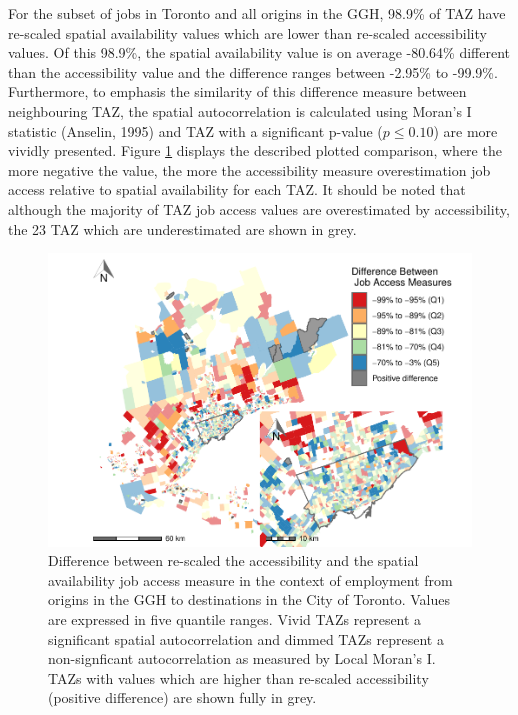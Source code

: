 \documentclass[]{elsarticle} %
\begin{document}
For the subset of jobs in Toronto and all origins in the GGH, 98.9\% of
TAZ have re-scaled spatial availability values which are lower than
re-scaled accessibility values. Of this 98.9\%, the spatial availability
value is on average -80.64\% different than the accessibility value and
the difference ranges between -2.95\% to -99.9\%. Furthermore, to
emphasis the similarity of this difference measure between neighbouring
TAZ, the spatial autocorrelation is calculated using Moran's I statistic
(Anselin, 1995) and TAZ with a significant p-value (\(p\le 0.10\)) are
more vividly presented. Figure \ref{fig:plot-local-i-Toronto} displays
the described plotted comparison, where the more negative the value, the
more the accessibility measure overestimation job access relative to
spatial availability for each TAZ. It should be noted that although the
majority of TAZ job access values are overestimated by accessibility,
the 23 TAZ which are underestimated are shown in grey.

\begin{figure}
\includegraphics[width=1\linewidth]{Spatial-Availability_files/figure-latex/plot-local-i-Toronto-1} \caption{\label{fig:plot-local-i-Toronto}Difference between re-scaled the accessibility and the spatial availability job access measure in the context of employment from origins in the GGH to destinations in the City of Toronto. Values are expressed in five quantile ranges. Vivid TAZs represent a significant spatial autocorrelation and dimmed TAZs represent a non-signficant autocorrelation as measured by Local Moran's I. TAZs with values which are higher than re-scaled accessibility (positive difference) are shown fully in grey.}\label{fig:plot-local-i-Toronto}
\end{figure}
\end{document}
